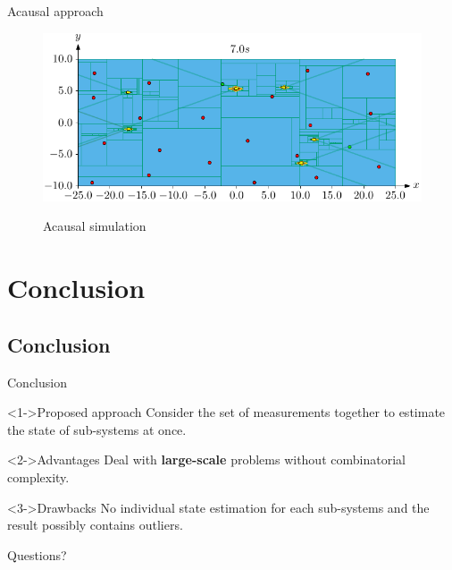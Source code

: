 \documentclass{beamer}
\begin{document}
            \begin{frame}{Acausal approach}
                \begin{figure}
                    \centering
                    \href{run:acausal.mp4?autostart}{\includegraphics[width=\textwidth]{imgs/acausal_cover}}
                    \caption{Acausal simulation}
                \end{figure}
            \end{frame}

    \section{Conclusion}

        \subsection{Conclusion}

            \begin{frame}{Conclusion}
                \centering
                \begin{minipage}{0.8\textwidth}
                    \begin{block}<1->{Proposed approach}
                        Consider the set of measurements together to estimate the state of sub-systems at once.
                    \end{block}
                    \begin{block}<2->{Advantages}
                        Deal with \textbf{large-scale} problems without combinatorial complexity.
                    \end{block}
                    \begin{block}<3->{Drawbacks}
                        No individual state estimation for each sub-systems and the result possibly contains outliers.
                    \end{block}
                \end{minipage}
            \end{frame}
    
    \appendix

    \begin{frame}[standout]
        Questions?
    \end{frame}
    
\end{document}
